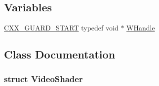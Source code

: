 \subsection*{Variables}
\begin{DoxyCompactItemize}
\item 
\mbox{\hyperlink{__builder_8h_af721f4bd9a2c3267a89d3967b3ca1747}{C\+X\+X\+\_\+\+G\+U\+A\+R\+D\+\_\+\+S\+T\+A\+RT}} typedef void $\ast$ \mbox{\hyperlink{video-backend_8h_aaa69bc83f36b455578d1f29b125741d9}{W\+Handle}}
\end{DoxyCompactItemize}


\subsection{Class Documentation}
\label{struct_video_shader}
\subsubsection{struct Video\+Shader}


